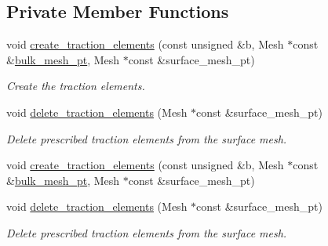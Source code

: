 \subsection*{Private Member Functions}
\begin{DoxyCompactItemize}
\item 
void \hyperlink{classCollapsibleChannelProblem_a70cfe97c12c0cb6a2a81266cdd4d6088}{create\+\_\+traction\+\_\+elements} (const unsigned \&b, Mesh $\ast$const \&\hyperlink{classCollapsibleChannelProblem_a49a428b5f489d11b3fb92199b72f6dd7}{bulk\+\_\+mesh\+\_\+pt}, Mesh $\ast$const \&surface\+\_\+mesh\+\_\+pt)
\begin{DoxyCompactList}\small\item\em Create the traction elements. \end{DoxyCompactList}\item 
void \hyperlink{classCollapsibleChannelProblem_a6a5324dd1efb8c517a7e4d431b10fca4}{delete\+\_\+traction\+\_\+elements} (Mesh $\ast$const \&surface\+\_\+mesh\+\_\+pt)
\begin{DoxyCompactList}\small\item\em Delete prescribed traction elements from the surface mesh. \end{DoxyCompactList}\item 
void \hyperlink{classCollapsibleChannelProblem_a70cfe97c12c0cb6a2a81266cdd4d6088}{create\+\_\+traction\+\_\+elements} (const unsigned \&b, Mesh $\ast$const \&\hyperlink{classCollapsibleChannelProblem_a49a428b5f489d11b3fb92199b72f6dd7}{bulk\+\_\+mesh\+\_\+pt}, Mesh $\ast$const \&surface\+\_\+mesh\+\_\+pt)
\item 
void \hyperlink{classCollapsibleChannelProblem_a6a5324dd1efb8c517a7e4d431b10fca4}{delete\+\_\+traction\+\_\+elements} (Mesh $\ast$const \&surface\+\_\+mesh\+\_\+pt)
\begin{DoxyCompactList}\small\item\em Delete prescribed traction elements from the surface mesh. \end{DoxyCompactList}\end{DoxyCompactItemize}
